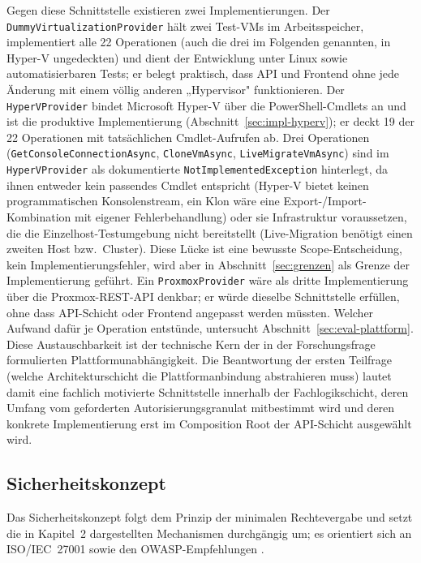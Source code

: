 \documentclass[12pt,a4paper]{article}
\begin{document}
Gegen diese Schnittstelle existieren zwei Implementierungen. Der \texttt{DummyVirtualizationProvider} hält zwei Test-VMs im Arbeitsspeicher, implementiert alle 22 Operationen (auch die drei im Folgenden genannten, in Hyper-V ungedeckten) und dient der Entwicklung unter Linux sowie automatisierbaren Tests; er belegt praktisch, dass API und Frontend ohne jede Änderung mit einem völlig anderen „Hypervisor" funktionieren. Der \texttt{HyperVProvider} bindet Microsoft Hyper-V über die PowerShell-Cmdlets an und ist die produktive Implementierung (Abschnitt~\ref{sec:impl-hyperv}); er deckt 19 der 22 Operationen mit tatsächlichen Cmdlet-Aufrufen ab. Drei Operationen (\texttt{GetConsoleConnectionAsync}, \texttt{CloneVmAsync}, \texttt{LiveMigrateVmAsync}) sind im \texttt{HyperVProvider} als dokumentierte \texttt{NotImplementedException} hinterlegt, da ihnen entweder kein passendes Cmdlet entspricht (Hyper-V bietet keinen programmatischen Konsolenstream, ein Klon wäre eine Export-/Import-Kombination mit eigener Fehlerbehandlung) oder sie Infrastruktur voraussetzen, die die Einzelhost-Testumgebung nicht bereitstellt (Live-Migration benötigt einen zweiten Host bzw.\ Cluster). Diese Lücke ist eine bewusste Scope-Entscheidung, kein Implementierungsfehler, wird aber in Abschnitt~\ref{sec:grenzen} als Grenze der Implementierung geführt. Ein \texttt{ProxmoxProvider} wäre als dritte Implementierung über die Proxmox-REST-API denkbar; er würde dieselbe Schnittstelle erfüllen, ohne dass API-Schicht oder Frontend angepasst werden müssten. Welcher Aufwand dafür je Operation entstünde, untersucht Abschnitt~\ref{sec:eval-plattform}. Diese Austauschbarkeit ist der technische Kern der in der Forschungsfrage formulierten Plattformunabhängigkeit. Die Beantwortung der ersten Teilfrage (welche Architekturschicht die Plattformanbindung abstrahieren muss) lautet damit eine fachlich motivierte Schnittstelle innerhalb der Fachlogikschicht, deren Umfang vom geforderten Autorisierungsgranulat mitbestimmt wird und deren konkrete Implementierung erst im Composition Root der API-Schicht ausgewählt wird.

\subsection{Sicherheitskonzept}
\label{sec:sicherheitskonzept}

Das Sicherheitskonzept folgt dem Prinzip der minimalen Rechtevergabe und setzt die in Kapitel~2 dargestellten Mechanismen durchgängig um; es orientiert sich an ISO/IEC~27001 \parencite{iso27001-2022} sowie den OWASP-Empfehlungen \parencite{owasp-top10-2021}.
\end{document}
